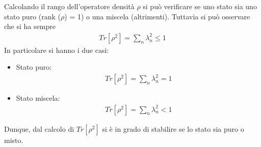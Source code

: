 Calcolando il rango dell'operatore densità $\rho$ si può verificare se uno stato sia uno stato puro (rank ($\rho$) = 1) o una miscela (altrimenti).
Tuttavia si può osservare che si ha sempre
\begin{equation}\begin{split}
Tr\left[\rho^2\right]=\sum_n{\lambda_n^2}\le 1
\end{split}\end{equation}
In particolare si hanno i due casi:
\begin{itemize}
\item Stato puro:
\begin{equation}\begin{split}
Tr\left[\rho^2\right]=\sum_n{\lambda_n^2}= 1
\end{split}\end{equation}
\item Stato miscela:
\begin{equation}\begin{split}
Tr\left[\rho^2\right]=\sum_n{\lambda_n^2}< 1
\end{split}\end{equation}
\end{itemize}
Dunque, dal calcolo di $Tr\left[\rho^2\right]$ si è in grado di stabilire se lo stato sia puro o misto.


%
% 
